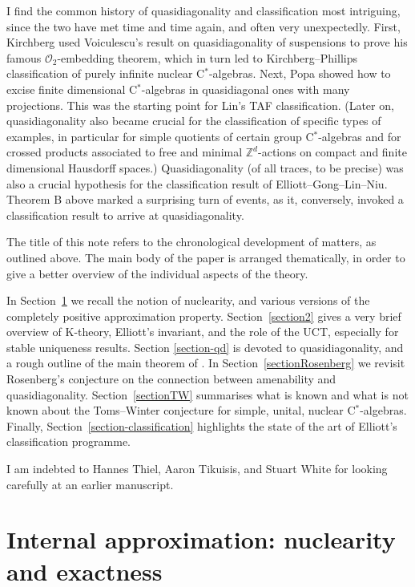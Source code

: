 \documentclass{amsart}
\begin{document}
I find the common history of quasidiagonality and classification most intriguing, since the two have met time and time again, and often very unexpectedly. First, Kirchberg used Voiculescu's result on quasidiagonality of suspensions to prove his famous $\mathcal{O}_2$-embedding theorem, which in turn led to Kirchberg--Phillips classification of purely infinite nuclear C$^*$-algebras. Next, Popa showed how to excise finite dimensional C$^*$-algebras in quasidiagonal ones with many projections. This was the starting point for Lin's TAF classification. (Later on, quasidiagonality also became crucial for the classification of specific types of examples, in particular for simple quotients of certain group C$^*$-algebras and for crossed products associated to free and minimal $\mathbb{Z}^d$-actions on compact and finite dimensional Hausdorff spaces.) Quasidiagonality (of all traces, to be precise) was also a crucial hypothesis for the classification result of Elliott--Gong--Lin--Niu. Theorem B above marked a surprising turn of events, as it, conversely, invoked a classification result to arrive at quasidiagonality.


The title of this note refers to the chronological development of matters, as outlined above. The main body of the paper is arranged thematically, in order to give a better overview of the individual aspects of the theory.


In Section~{\ref{section1}} we recall the notion of nuclearity, and various versions of the completely positive approximation property. Section~{\ref{section2}} gives a very brief overview of K-theory, Elliott's invariant, and the role of the UCT, especially for stable uniqueness results. Section {\ref{section-qd}} is devoted to quasidiagonality, and a rough outline of the main theorem of \cite{TWW}. In Section~{\ref{sectionRosenberg}} we revisit Rosenberg's conjecture on the connection between amenability and quasidiagonality. Section~{\ref{sectionTW}} summarises what is known and what is not known about the Toms--Winter conjecture for simple, unital, nuclear C$^*$-algebras. Finally, Section~{\ref{section-classification}} highlights the state of the art of Elliott's classification  programme.

I am indebted to Hannes Thiel, Aaron Tikuisis, and Stuart White for looking carefully at an earlier manuscript. 


\section{Internal approximation: nuclearity and exactness}
\label{section1}
\end{document}
